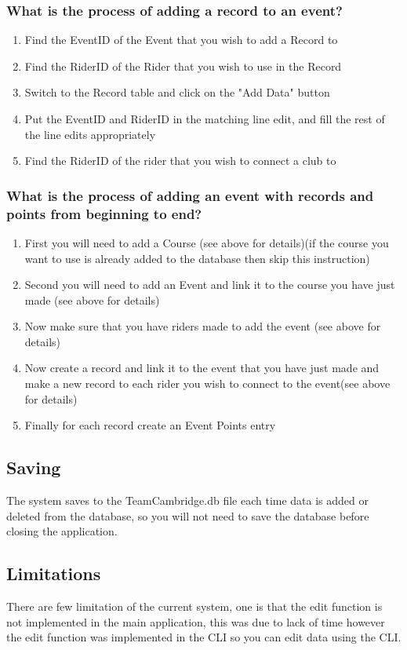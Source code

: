 \subsubsection{What is the process of adding a record to an event?}
\begin{enumerate}
\item Find the EventID of the Event that you wish to add a Record to
\item Find the RiderID of the Rider that you wish to use in the Record
\item Switch to the Record table and click on the "Add Data" button
\item Put the EventID and RiderID in the matching line edit, and fill the rest of the line edits appropriately
\item Find the RiderID of the rider that you wish to connect a club to
\end{enumerate}
\subsubsection{What is the process of adding an event with records and points from beginning to end?}
\begin{enumerate}
\item First you will need to add a Course (see above for details)(if the course you want to use is already added to the database then skip this instruction)
\item Second you will need to add an Event and link it to the course you have just made (see above for details)
\item Now make sure that you have riders made to add the event (see above for details)
\item Now create a record and link it to the event that you have just made and make a new record to each rider you wish to connect to the event(see above for details)
\item Finally for each record create an Event Points entry
\end{enumerate}

\subsection{Saving}
The system saves to the TeamCambridge.db file each time data is added or deleted from the database, so you will not need to save the database before closing the application.
\subsection{Limitations}
There are few limitation of the current system, one is that the edit function is not implemented in the main application, this was due to lack of time however the edit function was implemented in the CLI so you can edit data using the CLI.

